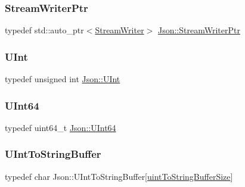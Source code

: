 \subsubsection{\texorpdfstring{Stream\+Writer\+Ptr}{StreamWriterPtr}}
{\footnotesize\ttfamily typedef std\+::auto\+\_\+ptr$<$\hyperlink{classJson_1_1StreamWriter}{Stream\+Writer}$>$ \hyperlink{namespaceJson_a7132404aeebfc96d7c6ad2c66260afb5_a7132404aeebfc96d7c6ad2c66260afb5}{Json\+::\+Stream\+Writer\+Ptr}}

\mbox{\label{namespaceJson_a800fb90eb6ee8d5d62b600c06f87f7d4_a800fb90eb6ee8d5d62b600c06f87f7d4}} 
\subsubsection{\texorpdfstring{U\+Int}{UInt}}
{\footnotesize\ttfamily typedef unsigned int \hyperlink{namespaceJson_a800fb90eb6ee8d5d62b600c06f87f7d4_a800fb90eb6ee8d5d62b600c06f87f7d4}{Json\+::\+U\+Int}}

\mbox{\label{namespaceJson_adf3fa5cb60c619e4f02315ad355e0ca1_adf3fa5cb60c619e4f02315ad355e0ca1}} 
\subsubsection{\texorpdfstring{U\+Int64}{UInt64}}
{\footnotesize\ttfamily typedef uint64\+\_\+t \hyperlink{namespaceJson_adf3fa5cb60c619e4f02315ad355e0ca1_adf3fa5cb60c619e4f02315ad355e0ca1}{Json\+::\+U\+Int64}}

\mbox{\label{namespaceJson_a602bcf69c2042fb61c3b243cb16f04ca_a602bcf69c2042fb61c3b243cb16f04ca}} 
\subsubsection{\texorpdfstring{U\+Int\+To\+String\+Buffer}{UIntToStringBuffer}}
{\footnotesize\ttfamily typedef char Json\+::\+U\+Int\+To\+String\+Buffer\mbox{[}\hyperlink{namespaceJson_a2aacab54ef6fc18e833fbd4982a0a23a_a2aacab54ef6fc18e833fbd4982a0a23aae4f2008c7919f20d81286121d1374424}{uint\+To\+String\+Buffer\+Size}\mbox{]}}



